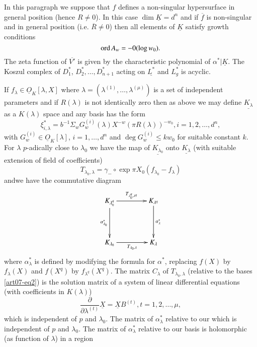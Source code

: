 In this paragraph we suppose that $f$ defines a non-singular hypersurface in general position (hence $R\neq 0$). In this case $\dim \underline{K}=d^{n}$ and if $\overline{f}$ is non-singular and in general position (i.e. $\overline{R}\neq 0$) then all elements of $\underline{K}$ satisfy growth conditions 
\begin{equation}
\operatorname{\mathrm{ord}} A_{w}=-0(\log w_{0}).\label{art07-eq1}
\end{equation}
The zeta function of $\overline{V'}$ is given by the characteristic polynomial of $\alpha^{*}|\underline{K}$. The Koszul complex of $D^{*}_{1}$, $D^{*}_{2},\ldots,D^{*}_{n+1}$ acting on $\underline{L^{*}}$ and $L^{*}_{g}$ is acyclic.

If $f_{\lambda}\in \underline{O}_{K}[\lambda,X]$ where $\lambda=(\lambda^{(1)},\ldots,\lambda^{(\mu)})$ is a set of independent parameters and if $R(\lambda)$ is not identically zero then as above we may define $\underline{K_{\lambda}}$ as a $K(\lambda)$ space and any basis has the form
\begin{equation}
\xi^{*}_{i,\lambda}=b^{-1}\Sigma_{w}G^{(i)}_{w}(\lambda)X^{-w}(\pi R(\lambda))^{-w_{0}}, i=1,2,\ldots,d^{n},\label{art07-eq2}
\end{equation}
with $G^{(i)}_{w}\in \underline{O}_{K}[\lambda]$, $i=1,\ldots,d^{n}$ and $\deg G^{(i)}_{w}\leq kw_{0}$ for suitable constant $k$. For $\lambda$ $p$-adically close to $\lambda_{0}$ we have the map of $\underline{K_{\lambda_{0}}}$ onto $\underline{K_{\lambda}}$ (with suitable extension of field of coefficients)
$$
T_{\lambda_{0},\lambda}=\gamma_{-}\circ \exp \pi X_{0}(f_{\lambda_{0}}-f_{\lambda})
$$
and\pageoriginale we have the commutative diagram
\[
\xymatrix@=1.5cm{
K_{\lambda^{q}_{0}}\ar[r]^-{T_{\lambda^{q}_{0},\lambda^{q}}}\ar[d]_-{\alpha^{*}_{\lambda_{0}}} & K_{\lambda^{q}}\ar[d]^-{\alpha^{*}_{\lambda}} \\
K_{\lambda_{0}}\ar[r]_-{T_{\lambda_{0},\lambda}} & K_{\lambda}
}
\]
where $\alpha^{*}_{\lambda}$ is defined by modifying the formula for $\alpha^{*}$, replacing $f(X)$ by $f_{\lambda}(X)$ and $f(X^{q})$ by $f_{\lambda^{q}}(X^{q})$. The matrix $C_{\lambda}$ of $T_{\lambda_{0},\lambda}$ (relative to the bases \eqref{art07-eq2}) is the solution matrix of a system of linear differential equations (with coefficients in $K(\lambda)$)
\begin{equation}
\dfrac{\partial}{\partial \lambda^{(t)}}\underline{X}=\underline{X}B^{(t)}, t=1,2,\ldots,\mu,\label{art07-eq3}
\end{equation}
which is independent of $p$ and $\lambda_{0}$. The matrix of $\alpha^{*}_{\lambda}$ relative to our which is independent of $p$ and $\lambda_{0}$. The matrix of $\alpha^{*}_{\lambda}$ relative to our basis is holomorphic (as function of $\lambda$) in a region
